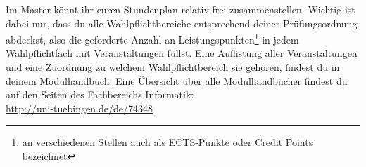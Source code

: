 Im Master könnt ihr euren Stundenplan relativ frei zusammenstellen. Wichtig ist dabei nur, dass du alle Wahlpflichtbereiche entsprechend deiner Prüfungsordnung abdeckst, also die geforderte Anzahl an Leistungspunkten\footnote{an verschiedenen Stellen auch als ECTS-Punkte oder Credit Points bezeichnet} in jedem Wahlpflichtfach mit Veranstaltungen füllst. Eine Auflistung aller Veranstaltungen und eine Zuordnung zu welchem Wahlpflichtbereich sie gehören, findest du in deinem Modulhandbuch. Eine Übersicht über alle Modulhandbücher findest du auf den Seiten des Fachbereichs Informatik: \\ 
\url{http://uni-tuebingen.de/de/74348}

